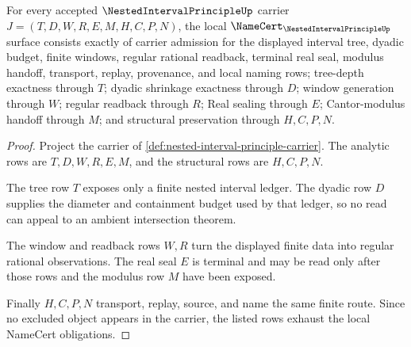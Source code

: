 \begin{theorem}
\label{thm:nested-interval-principle-namecert-obligations}
For every accepted $\NestedIntervalPrincipleUp$ carrier $J=(T,D,W,R,E,M,H,C,P,N)$, the local $\NameCert_{\NestedIntervalPrincipleUp}$ surface consists exactly of carrier admission for the displayed interval tree, dyadic budget, finite windows, regular rational readback, terminal real seal, modulus handoff, transport, replay, provenance, and local naming rows; tree-depth exactness through $T$; dyadic shrinkage exactness through $D$; window generation through $W$; regular readback through $R$; Real sealing through $E$; Cantor-modulus handoff through $M$; and structural preservation through $H,C,P,N$.
\end{theorem}
\begin{proof}
Project the carrier of \autoref{def:nested-interval-principle-carrier}. The analytic rows are $T,D,W,R,E,M$, and the structural rows are $H,C,P,N$.

The tree row $T$ exposes only a finite nested interval ledger. The dyadic row $D$ supplies the diameter and containment budget used by that ledger, so no read can appeal to an ambient intersection theorem.

The window and readback rows $W,R$ turn the displayed finite data into regular rational observations. The real seal $E$ is terminal and may be read only after those rows and the modulus row $M$ have been exposed.

Finally $H,C,P,N$ transport, replay, source, and name the same finite route. Since no excluded object appears in the carrier, the listed rows exhaust the local NameCert obligations.
\end{proof}

